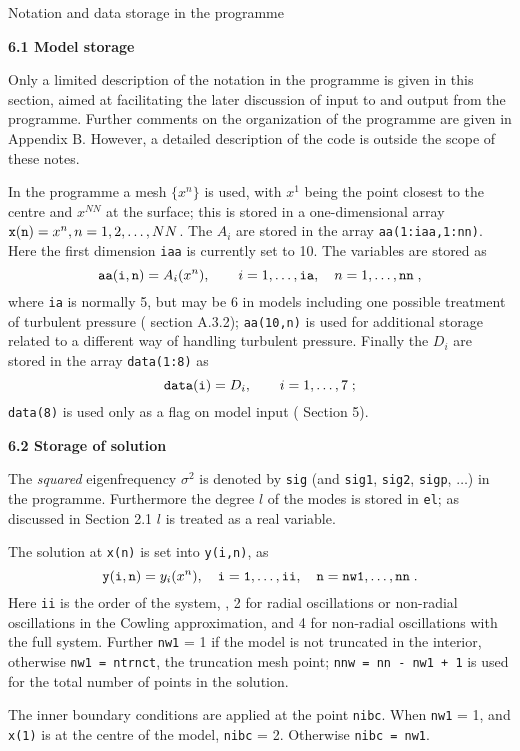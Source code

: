 \mainsect
\centerline{ Notation and data storage in the programme} 

\subsect
{\bf 6.1 Model storage}

Only a limited description of the notation in the programme is given in
this section, aimed at facilitating the later discussion of input to
and output from the programme.
Further comments on the organization of the programme are given in Appendix B.
However, a  detailed description of the code 
is outside the scope of these notes.

In the programme a mesh $\{ x^n \}$ is used, with $x^1 $
being the point closest to the centre and 
$x^{NN}$ at the surface; this is stored in a 
one-dimensional array ${\tt x(n)} = x^n ,  n = 1, 2, \ldots, NN$.
The $A_i$ are stored in the array {\tt aa(1:iaa,1:nn)}.
Here the first dimension {\tt iaa} is currently set to 10.
The variables are stored as
$$
{\tt aa(i,n)} = A_i ( x^n ) ,  \qquad i = 1,\ldots,{\tt ia}, 
\quad n = 1,\ldots, {\tt nn} \; ,
$$
where {\tt ia} is normally 5, but may be 6 in models including
one possible treatment of turbulent pressure ({\cf} section A.3.2);
{\tt aa(10,n)} is used for additional storage related to 
a different way of handling turbulent pressure.
Finally the $D_i$ are stored in the array {\tt data(1:8)} as
$$
{\tt data(i)} = D_i , \qquad  i = 1,\ldots,7  \; ;
$$
{\tt data(8)} is used only as a flag on model input 
({\cf} Section 5).

\subsect
{\bf 6.2 Storage of solution}

The {\it squared} eigenfrequency $\sigma^2$ is denoted by 
{\tt sig} (and {\tt sig1}, {\tt sig2}, {\tt sigp}, $\ldots$)
in the programme. Furthermore the degree $l$ of the modes is stored
in {\tt el};
as discussed in Section 2.1 $l$ is treated as a real variable.

The solution at {\tt x(n)} is set into {\tt y(i,n)}, 
as
$$
{\tt y(i,n)} = y_i ( x^n ) ,  \quad
{\tt i = 1,  \ldots,  ii, \quad  n = nw1,  \ldots,  nn} \; .
$$
Here {\tt ii} is the order of the system, {\ie},
2 for radial oscillations or non-radial oscillations in the Cowling
approximation, and 4 for non-radial oscillations with the full system.
Further {\tt nw1} = 1 if the model is not truncated in the interior, 
otherwise {\tt nw1 = ntrnct}, the truncation mesh point;
{\tt nnw = nn - nw1 + 1} is used for
the total number of points in the solution.

The inner boundary conditions are applied at the point {\tt nibc}.
When {\tt nw1} = 1, and {\tt x(1)} is at the centre of the model,
{\tt nibc} = 2.
Otherwise {\tt nibc = nw1}.


